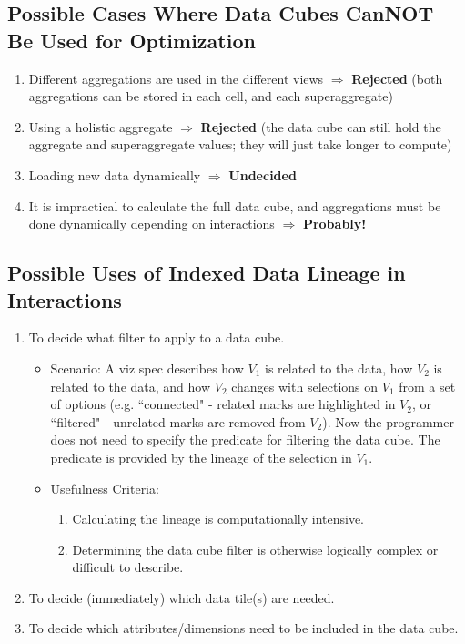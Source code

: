\subsection{Possible Cases Where Data Cubes CanNOT Be Used for Optimization}
\begin{enumerate}
	\item Different aggregations are used in the different views $\Rightarrow$ \textbf{Rejected} (both aggregations can be stored in each cell, and each superaggregate)
	\item Using a holistic aggregate $\Rightarrow$ \textbf{Rejected} (the data cube can still hold the aggregate and superaggregate values; they will just take longer to compute)
	\item Loading new data dynamically $\Rightarrow$ \textbf{Undecided}
	\item It is impractical to calculate the full data cube, and aggregations must be done dynamically depending on interactions $\Rightarrow$ \textbf{Probably!}
\end{enumerate}
\subsection{Possible Uses of Indexed Data Lineage in Interactions}
\begin{enumerate}
	\item To decide what filter to apply to a data cube.
		\begin{itemize}
			\item Scenario: A viz spec describes how $V_1$ is related to the data, how $V_2$ is related to the data, and how $V_2$ changes with selections on $V_1$ from a set of options (e.g. ``connected" - related marks are highlighted in $V_2$, or ``filtered" - unrelated marks are removed from $V_2$).
			Now the programmer does not need to specify the predicate for filtering the data cube.
			The predicate is provided by the lineage of the selection in $V_1$.
			\item Usefulness Criteria:
				\begin{enumerate}
					\item Calculating the lineage is computationally intensive.
					\item Determining the data cube filter is otherwise logically complex or difficult to describe.
				\end{enumerate}
		\end{itemize}
	\item To decide (immediately) which data tile(s) are needed.
	\item To decide which attributes/dimensions need to be included in the data cube.
\end{enumerate}
